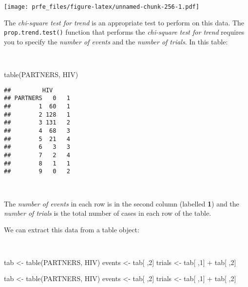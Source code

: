 \documentclass[
  12pt,
  a4paper]{book}
\newenvironment{Shaded}{\begin{snugshade}}{\end{snugshade}}
\newcommand{\DecValTok}[1]{\textcolor[rgb]{0.00,0.00,0.81}{#1}}
\newcommand{\FunctionTok}[1]{\textcolor[rgb]{0.00,0.00,0.00}{#1}}
\newcommand{\NormalTok}[1]{#1}
\newcommand{\OtherTok}[1]{\textcolor[rgb]{0.56,0.35,0.01}{#1}}
\newcommand{\SpecialCharTok}[1]{\textcolor[rgb]{0.00,0.00,0.00}{#1}}
\begin{document}
\texttt{[image: prfe\_files/figure-latex/unnamed-chunk-256-1.pdf]}

\newpage

The \emph{chi-square test for trend} is an appropriate test to perform on this data. The \texttt{prop.trend.test()} function that performs the \emph{chi-square test for trend} requires you to specify the \emph{number of events} and the \emph{number of trials}. In this table:

~

\begin{Shaded}
\begin{Highlighting}[]
\FunctionTok{table}\NormalTok{(PARTNERS, HIV)}
\end{Highlighting}
\end{Shaded}

\begin{verbatim}
##         HIV
## PARTNERS   0   1
##        1  60   1
##        2 128   1
##        3 131   2
##        4  68   3
##        5  21   4
##        6   3   3
##        7   2   4
##        8   1   1
##        9   0   2
\end{verbatim}

~

The \emph{number of events} in each row is in the second column (labelled \textbf{1}) and the \emph{number of trials} is the total number of cases in each row of the table.

We can extract this data from a table object:

~

\begin{Shaded}
\begin{Highlighting}[]
\NormalTok{tab }\OtherTok{\textless{}{-}} \FunctionTok{table}\NormalTok{(PARTNERS, HIV)}
\NormalTok{events }\OtherTok{\textless{}{-}}\NormalTok{ tab[ ,}\DecValTok{2}\NormalTok{]}
\NormalTok{trials }\OtherTok{\textless{}{-}}\NormalTok{ tab[ ,}\DecValTok{1}\NormalTok{] }\SpecialCharTok{+}\NormalTok{ tab[ ,}\DecValTok{2}\NormalTok{]}
\end{Highlighting}
\end{Shaded}

\begin{Shaded}
\begin{Highlighting}[]
\NormalTok{tab }\OtherTok{\textless{}{-}} \FunctionTok{table}\NormalTok{(PARTNERS, HIV)}
\NormalTok{events }\OtherTok{\textless{}{-}}\NormalTok{ tab[ ,}\DecValTok{2}\NormalTok{]}
\NormalTok{trials }\OtherTok{\textless{}{-}}\NormalTok{ tab[ ,}\DecValTok{1}\NormalTok{] }\SpecialCharTok{+}\NormalTok{ tab[ ,}\DecValTok{2}\NormalTok{]}
\end{Highlighting}
\end{Shaded}
\end{document}
